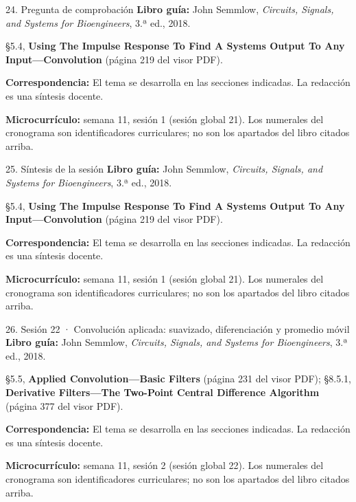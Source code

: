 \documentclass[
  10pt,
  ignorenonframetext,
  aspectratio=169,
  spanish,
]{beamer}
\begin{document}
\begin{frame}{24. Pregunta de comprobación}
\label{pregunta-de-comprobaciuxf3n}
\textbf{Libro guía:} John Semmlow, \emph{Circuits, Signals, and Systems
for Bioengineers}, 3.ª ed., 2018.

§5.4, \textbf{Using The Impulse Response To Find A Systems Output To Any
Input---Convolution} (página 219 del visor PDF).

\textbf{Correspondencia:} El tema se desarrolla en las secciones
indicadas. La redacción es una síntesis docente.

\textbf{Microcurrículo:} semana 11, sesión 1 (sesión global 21). Los
numerales del cronograma son identificadores curriculares; no son los
apartados del libro citados arriba.
\end{frame}

\begin{frame}{25. Síntesis de la sesión}
\label{suxedntesis-de-la-sesiuxf3n}
\textbf{Libro guía:} John Semmlow, \emph{Circuits, Signals, and Systems
for Bioengineers}, 3.ª ed., 2018.

§5.4, \textbf{Using The Impulse Response To Find A Systems Output To Any
Input---Convolution} (página 219 del visor PDF).

\textbf{Correspondencia:} El tema se desarrolla en las secciones
indicadas. La redacción es una síntesis docente.

\textbf{Microcurrículo:} semana 11, sesión 1 (sesión global 21). Los
numerales del cronograma son identificadores curriculares; no son los
apartados del libro citados arriba.
\end{frame}

\begin{frame}{26. Sesión 22 · Convolución aplicada: suavizado,
diferenciación y promedio móvil}
\label{sesiuxf3n-22-convoluciuxf3n-aplicada-suavizado-diferenciaciuxf3n-y-promedio-muxf3vil}
\textbf{Libro guía:} John Semmlow, \emph{Circuits, Signals, and Systems
for Bioengineers}, 3.ª ed., 2018.

§5.5, \textbf{Applied Convolution---Basic Filters} (página 231 del visor
PDF); §8.5.1, \textbf{Derivative Filters---The Two-Point Central
Difference Algorithm} (página 377 del visor PDF).

\textbf{Correspondencia:} El tema se desarrolla en las secciones
indicadas. La redacción es una síntesis docente.

\textbf{Microcurrículo:} semana 11, sesión 2 (sesión global 22). Los
numerales del cronograma son identificadores curriculares; no son los
apartados del libro citados arriba.
\end{frame}
\end{document}
